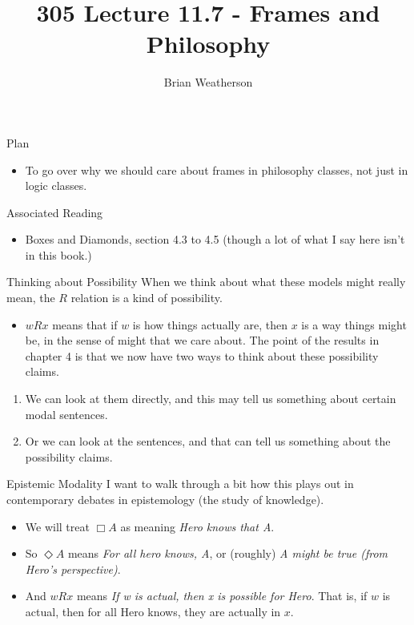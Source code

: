 \documentclass[
  ignorenonframetext,
]{beamer}
\title{305 Lecture 11.7 - Frames and Philosophy}
\author{Brian Weatherson}
\date{}
\providecommand{\tightlist}{%
  \setlength{\itemsep}{0pt}\setlength{\parskip}{0pt}}
\renewcommand{\,}{\text{, }}
\begin{document}
\frame{\titlepage}

\begin{frame}{Plan}
\protect\hypertarget{plan}{}
\begin{itemize}
\tightlist
\item
  To go over why we should care about frames in philosophy classes, not
  just in logic classes.
\end{itemize}
\end{frame}

\begin{frame}{Associated Reading}
\protect\hypertarget{associated-reading}{}
\begin{itemize}
\tightlist
\item
  Boxes and Diamonds, section 4.3 to 4.5 (though a lot of what I say
  here isn't in this book.)
\end{itemize}
\end{frame}

\begin{frame}{Thinking about Possibility}
\protect\hypertarget{thinking-about-possibility}{}
When we think about what these models might really mean, the \(R\)
relation is a kind of possibility.

\begin{itemize}
\tightlist
\item
  \(wRx\) means that if \(w\) is how things actually are, then \(x\) is
  a way things might be, in the sense of might that we care about.
  \pause  The point of the results in chapter 4 is that we now have two
  ways to think about these possibility claims.
\end{itemize}

\begin{enumerate}
\tightlist
\item
  We can look at them directly, and this may tell us something about
  certain modal sentences.
\item
  Or we can look at the sentences, and that can tell us something about
  the possibility claims.
\end{enumerate}
\end{frame}

\begin{frame}{Epistemic Modality}
\protect\hypertarget{epistemic-modality}{}
I want to walk through a bit how this plays out in contemporary debates
in epistemology (the study of knowledge).

\begin{itemize}
\tightlist
\item
  We will treat \(\Box A\) as meaning \emph{Hero knows that A}.
\item
  So \(\Diamond A\) means \emph{For all hero knows, A}, or (roughly)
  \emph{A might be true (from Hero's perspective)}.
\item
  And \(wRx\) means \emph{If w is actual, then x is possible for Hero}.
  That is, if \(w\) is actual, then for all Hero knows, they are
  actually in \(x\).
\end{itemize}
\end{frame}
\end{document}
